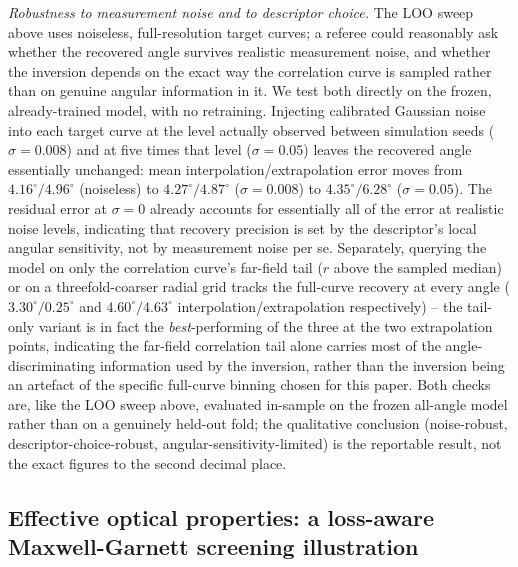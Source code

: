 \documentclass[aip,amsmath,amssymb,reprint]{revtex4-1}
\begin{document}
\textit{Robustness to measurement noise and to descriptor choice.} The LOO
sweep above uses noiseless, full-resolution target curves; a referee could
reasonably ask whether the recovered angle survives realistic measurement
noise, and whether the inversion depends on the exact way the correlation
curve is sampled rather than on genuine angular information in it. We test
both directly on the frozen, already-trained model, with no retraining.
Injecting calibrated Gaussian noise into each target curve at the level
actually observed between simulation seeds ($\sigma=0.008$) and at five
times that level ($\sigma=0.05$) leaves the recovered angle essentially
unchanged: mean interpolation/extrapolation error moves from
$4.16^{\circ}/4.96^{\circ}$ (noiseless) to $4.27^{\circ}/4.87^{\circ}$
($\sigma=0.008$) to $4.35^{\circ}/6.28^{\circ}$ ($\sigma=0.05$). The
residual error at $\sigma=0$ already accounts for essentially all of the
error at realistic noise levels, indicating that recovery precision is set
by the descriptor's local angular sensitivity, not by measurement noise per
se. Separately, querying the model on only the correlation curve's
far-field tail ($r$ above the sampled median) or on a threefold-coarser
radial grid tracks the full-curve recovery at every angle
($3.30^{\circ}/0.25^{\circ}$ and $4.60^{\circ}/4.63^{\circ}$
interpolation/extrapolation respectively) -- the tail-only variant is in
fact the \emph{best}-performing of the three at the two extrapolation
points, indicating the far-field correlation tail alone carries most of
the angle-discriminating information used by the inversion, rather than
the inversion being an artefact of the specific full-curve binning chosen
for this paper. Both checks are, like the LOO sweep above, evaluated
in-sample on the frozen all-angle model rather than on a genuinely
held-out fold; the qualitative conclusion (noise-robust,
descriptor-choice-robust, angular-sensitivity-limited) is the reportable
result, not the exact figures to the second decimal place.

\subsection{Effective optical properties: a loss-aware Maxwell-Garnett screening illustration}
\label{ssec:nif_optical}
\end{document}
